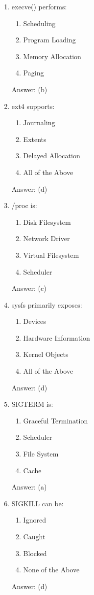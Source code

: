 \begin{enumerate}
\item execve() performs:
\begin{enumerate}[label=(\alph*)]
\item Scheduling
\item Program Loading
\item Memory Allocation
\item Paging
\end{enumerate}
Answer: (b)

\item ext4 supports:
\begin{enumerate}[label=(\alph*)]
\item Journaling
\item Extents
\item Delayed Allocation
\item All of the Above
\end{enumerate}
Answer: (d)

\item /proc is:
\begin{enumerate}[label=(\alph*)]
\item Disk Filesystem
\item Network Driver
\item Virtual Filesystem
\item Scheduler
\end{enumerate}
Answer: (c)

\item sysfs primarily exposes:
\begin{enumerate}[label=(\alph*)]
\item Devices
\item Hardware Information
\item Kernel Objects
\item All of the Above
\end{enumerate}
Answer: (d)

\item SIGTERM is:
\begin{enumerate}[label=(\alph*)]
\item Graceful Termination
\item Scheduler
\item File System
\item Cache
\end{enumerate}
Answer: (a)

\item SIGKILL can be:
\begin{enumerate}[label=(\alph*)]
\item Ignored
\item Caught
\item Blocked
\item None of the Above
\end{enumerate}
Answer: (d)


\end{enumerate}
